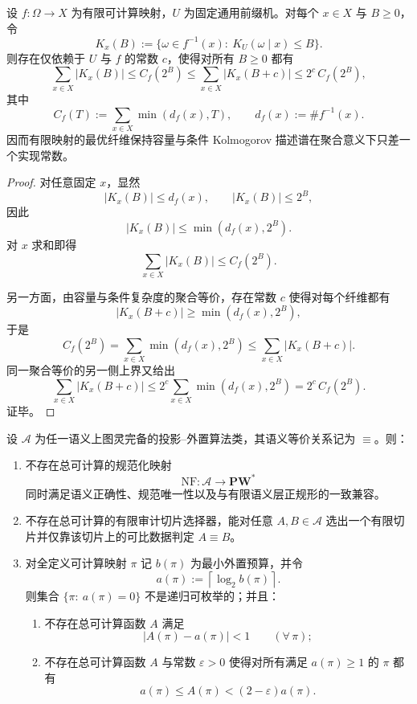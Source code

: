 \begin{theorem}[有限纤维容量的算法会计定理]\label{thm:conclusion-finite-fiber-capacity-algorithmic-accounting}
设 \(f:\Omega\to X\) 为有限可计算映射，\(U\) 为固定通用前缀机。对每个 \(x\in X\) 与 \(B\ge 0\)，令
\[
K_x(B):=\{\omega\in f^{-1}(x):\ K_U(\omega\mid x)\le B\}.
\]
则存在仅依赖于 \(U\) 与 \(f\) 的常数 \(c\)，使得对所有 \(B\ge 0\) 都有
\[
\sum_{x\in X}|K_x(B)|
\le
C_f(2^B)
\le
\sum_{x\in X}|K_x(B+c)|
\le
2^c\,C_f(2^B),
\]
其中
\[
C_f(T):=\sum_{x\in X}\min(d_f(x),T),
\qquad
d_f(x):=\#f^{-1}(x).
\]
因而有限映射的最优纤维保持容量与条件 Kolmogorov 描述谱在聚合意义下只差一个实现常数。
\end{theorem}

\begin{proof}
对任意固定 \(x\)，显然
\[
|K_x(B)|\le d_f(x),
\qquad
|K_x(B)|\le 2^B,
\]
因此
\[
|K_x(B)|\le \min(d_f(x),2^B).
\]
对 \(x\) 求和即得
\[
\sum_{x\in X}|K_x(B)|\le C_f(2^B).
\]

另一方面，由容量与条件复杂度的聚合等价，存在常数 \(c\) 使得对每个纤维都有
\[
|K_x(B+c)|\ge \min(d_f(x),2^B),
\]
于是
\[
C_f(2^B)
=
\sum_{x\in X}\min(d_f(x),2^B)
\le
\sum_{x\in X}|K_x(B+c)|.
\]
同一聚合等价的另一侧上界又给出
\[
\sum_{x\in X}|K_x(B+c)|
\le
2^c\sum_{x\in X}\min(d_f(x),2^B)
=
2^c\,C_f(2^B).
\]
证毕。
\end{proof}

\begin{theorem}[全局严格化不可能与旁带位数的不可近似性]\label{thm:conclusion-global-strictification-sideband-inapproximability}
设 \(\mathcal A\) 为任一语义上图灵完备的投影--外置算法类，其语义等价关系记为 \(\equiv\)。则：
\begin{enumerate}
  \item 不存在总可计算的规范化映射
  \[
  \mathrm{NF}:\mathcal A\to \mathbf{PW}^\ast
  \]
  同时满足语义正确性、规范唯一性以及与有限语义层正规形的一致兼容。
  \item 不存在总可计算的有限审计切片选择器，能对任意 \(A,B\in\mathcal A\) 选出一个有限切片并仅靠该切片上的可比数据判定 \(A\equiv B\)。
  \item 对全定义可计算映射 \(\pi\) 记 \(b(\pi)\) 为最小外置预算，并令
  \[
  a(\pi):=\left\lceil \log_2 b(\pi)\right\rceil.
  \]
  则集合 \(\{\pi:\ a(\pi)=0\}\) 不是递归可枚举的；并且：
  \begin{enumerate}
    \item 不存在总可计算函数 \(A\) 满足
    \[
    |A(\pi)-a(\pi)|<1
    \qquad (\forall\,\pi);
    \]
    \item 不存在总可计算函数 \(A\) 与常数 \(\varepsilon>0\) 使得对所有满足 \(a(\pi)\ge 1\) 的 \(\pi\) 都有
    \[
    a(\pi)\le A(\pi)<(2-\varepsilon)a(\pi).
    \]
  \end{enumerate}
\end{enumerate}
\end{theorem}

